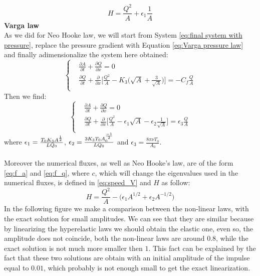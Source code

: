 \documentclass[12pt,a4paper]{article}
\numberwithin{equation}{section}
\begin{document}
\begin{equation}
H = \frac{Q^2}{A} + \epsilon_1 \frac{1}{A}
\end{equation}
{\bf Varga law}\\
As we did for Neo Hooke law, we will start from System \ref{eq:final system with pressure}, replace the pressure gradient with Equation \ref{eq:Varga pressure law} and finally adimensionalize the system here obtained:
\begin{equation}
  \left\{
      \begin{aligned}
       & \frac{\partial A}{\partial t} + \frac{\partial Q}{\partial x} = 0\\
       &  \frac{\partial Q}{\partial t} +\frac{\partial}{\partial x}\Bigg[\frac{Q^2}{A}-K_3 \Bigg(\sqrt{A}+\frac{3}{\sqrt{A}}\Bigg)\Bigg] = -C_f \frac{Q}{A} \\
      \end{aligned}
    \right.
\end{equation}
Then we find:
\begin{equation}
  \left\{
      \begin{aligned}
       & \frac{\partial A}{\partial t} + \frac{\partial Q}{\partial x} = 0\\
       &  \frac{\partial Q}{\partial t} +\frac{\partial}{\partial x}\Bigg[\frac{Q^2}{A}- \epsilon_1\sqrt{A}-\epsilon_2\frac{1}{\sqrt{A}}\Bigg] = \epsilon_3\frac{Q}{A} \\
      \end{aligned}
    \right.
\end{equation}
where $\epsilon_1 = \frac{T_0 K_3 A^{1\over 2}}{L Q_0}$, $\epsilon_2 = \frac{3 K_3 T_0 A_0^{-1 \over 2}}{L Q_0}$ and $\epsilon_3 = \frac{8\pi \nu T_0}{A_0}$.\\
\\
Moreover the numerical fluxes, as well as Neo Hooke's law, are of the form \ref{eq:f_a} and \ref{eq:f_q}, where $c$, which will change the eigenvalues used in the numerical fluxes, is defined in \ref{eq:speed_V} and $H$ as follow:
\begin{equation}
H = \frac{Q^2}{A}-\big(\epsilon_1 A^{1/2}+ \epsilon_2 A^{-1/2}\big)
\end{equation}
\noindent
In the following figure we make a comparison between the non-linear laws, with the exact solution for small amplitudes. We can see that they are similar because by linearizing the hyperelastic laws we should obtain the elastic one, even so, the amplitude does not coincide, both the non-linear laws are around $0.8$, while the exact solution is not much more smaller then $1$. This fact can be explained by the fact that these two solutions are obtain with an initial amplitude of the impulse equal to $0.01$, which probably is not enough small to get the exact linearization.
\end{document}
